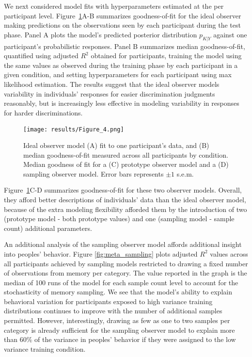 \documentclass[10pt,letterpaper]{article}
\begin{document}
We next considered model fits with hyperparameters estimated at the per participant level. Figure~\ref{fig:Figure_4}A-B summarizes goodness-of-fit for the ideal observer making predictions on the observations seen by each participant during the test phase. Panel A plots the model's predicted posterior distribution $p_{K|Y}$ against one participant's probabilistic responses. Panel B summarizes median goodness-of-fit, quantified using adjusted $R^2$ obtained for participants, training the model using the same values as observed during the training phase by each participant in a given condition, and setting hyperparameters for each participant using max likelihood estimation. The results suggest that the ideal observer models variability in individuals' responses for easier discrimination judgments reasonably, but is increasingly less effective in modeling variability in responses for harder discriminations. 

\begin{figure}[h!]
    \centering
    \texttt{[image: results/Figure\_4.png]}
    \caption{Ideal observer model (A) fit to one participant's data, and (B) median goodness-of-fit measured across all participants by condition. Median goodness of fit for a (C) prototype observer model and a (D) sampling observer model. Error bars represents $\pm 1$ s.e.m.} 
    \label{fig:Figure_4}
\end{figure}

Figure~\ref{fig:Figure_4}C-D summarizes goodness-of-fit for these two observer models. Overall, they afford better descriptions of individuals' data than the ideal observer model, because of the extra modeling flexibility afforded them by the introduction of two (prototype model - both prototype values) and one (sampling model - sample count) additional parameters. 

An additional analysis of the sampling observer model affords additional insight into peoples' behavior. Figure \ref{fig:meta_sampling} plots adjusted $R^2$ values across all participants achieved by sampling models restricted to drawing a fixed number of observations from memory per category. The value reported in the graph is the median of 100 runs of the model for each sample count level to account for the stochasticity of memory sampling. We see that the model's ability to explain behavioral variation for participants exposed to high variance training distributions continues to improve with the number of additional samples permitted. However, interestingly, drawing as few as one to two samples per category is already sufficient for the sampling observer model to explain more than 60\% of the variance in peoples' behavior if they were assigned to the low variance training condition.   
\end{document}
